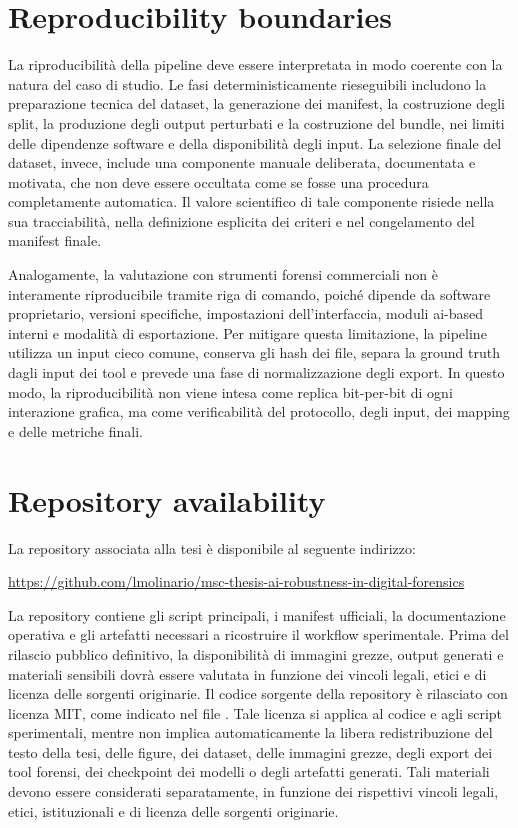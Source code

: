 \section{Reproducibility boundaries}
\label{app:reproducibility-boundaries}

La riproducibilità della pipeline deve essere interpretata in modo coerente con la natura del caso di studio. Le fasi deterministicamente rieseguibili includono la preparazione tecnica del dataset, la generazione dei manifest, la costruzione degli split, la produzione degli output perturbati e la costruzione del bundle, nei limiti delle dipendenze software e della disponibilità degli input. La selezione finale del dataset, invece, include una componente manuale deliberata, documentata e motivata, che non deve essere occultata come se fosse una procedura completamente automatica. Il valore scientifico di tale componente risiede nella sua tracciabilità, nella definizione esplicita dei criteri e nel congelamento del manifest finale.

Analogamente, la valutazione con strumenti forensi commerciali non è interamente riproducibile tramite riga di comando, poiché dipende da software proprietario, versioni specifiche, impostazioni dell'interfaccia, moduli \gls{ai}-based interni e modalità di esportazione. Per mitigare questa limitazione, la pipeline utilizza un input cieco comune, conserva gli hash dei file, separa la ground truth dagli input dei tool e prevede una fase di normalizzazione degli export. In questo modo, la riproducibilità non viene intesa come replica bit-per-bit di ogni interazione grafica, ma come verificabilità del protocollo, degli input, dei mapping e delle metriche finali.

\section{Repository availability}
\label{app:repository-availability}

La repository associata alla tesi è disponibile al seguente indirizzo:

\begin{center}
\url{https://github.com/lmolinario/msc-thesis-ai-robustness-in-digital-forensics}
\end{center}

La repository contiene gli script principali, i manifest ufficiali, la documentazione operativa e gli artefatti necessari a ricostruire il workflow sperimentale. Prima del rilascio pubblico definitivo, la disponibilità di immagini grezze, output generati e materiali sensibili dovrà essere valutata in funzione dei vincoli legali, etici e di licenza delle sorgenti originarie. Il codice sorgente della repository è rilasciato con licenza MIT, come indicato nel file . Tale licenza si applica al codice e agli script sperimentali, mentre non implica automaticamente la libera redistribuzione del testo della tesi, delle figure, dei dataset, delle immagini grezze, degli export dei tool forensi, dei checkpoint dei modelli o degli artefatti generati. Tali materiali devono essere considerati separatamente, in funzione dei rispettivi vincoli legali, etici, istituzionali e di licenza delle sorgenti originarie.
